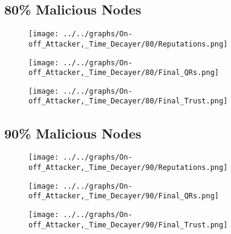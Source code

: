 \begin{minipage}[t]{0.49\columnwidth}
\subsection*{80\% Malicious Nodes}
    \begin{figure}[H]
        \centering
        \texttt{[image: ../../graphs/On-off\_Attacker,\_Time\_Decayer/80/Reputations.png]}
    \end{figure}
    \begin{figure}[H]
        \centering
        \texttt{[image: ../../graphs/On-off\_Attacker,\_Time\_Decayer/80/Final\_QRs.png]}
    \end{figure}
\end{minipage}
\begin{minipage}[t]{0.49\columnwidth}
    \begin{figure}[H]
        \centering
        \texttt{[image: ../../graphs/On-off\_Attacker,\_Time\_Decayer/80/Final\_Trust.png]}
    \end{figure}
\end{minipage}

\begin{minipage}[t]{0.49\columnwidth}
\subsection*{90\% Malicious Nodes}
    \begin{figure}[H]
        \centering
        \texttt{[image: ../../graphs/On-off\_Attacker,\_Time\_Decayer/90/Reputations.png]}
    \end{figure}
    \begin{figure}[H]
        \centering
        \texttt{[image: ../../graphs/On-off\_Attacker,\_Time\_Decayer/90/Final\_QRs.png]}
    \end{figure}
\end{minipage}
\begin{minipage}[t]{0.49\columnwidth}
    \begin{figure}[H]
        \centering
        \texttt{[image: ../../graphs/On-off\_Attacker,\_Time\_Decayer/90/Final\_Trust.png]}
    \end{figure}
\end{minipage}
\newpage

